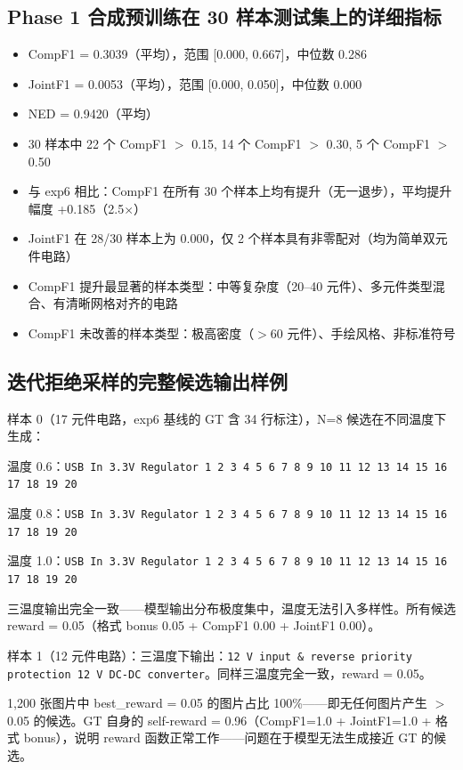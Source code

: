 \subsection{Phase 1 合成预训练在 30 样本测试集上的详细指标}

\begin{itemize}[nosep]
    \item CompF1 = 0.3039（平均），范围 [0.000, 0.667]，中位数 0.286
    \item JointF1 = 0.0053（平均），范围 [0.000, 0.050]，中位数 0.000
    \item NED = 0.9420（平均）
    \item 30 样本中 22 个 CompF1 $>$ 0.15, 14 个 CompF1 $>$ 0.30, 5 个 CompF1 $>$ 0.50
    \item 与 exp6 相比：CompF1 在所有 30 个样本上均有提升（无一退步），平均提升幅度 +0.185（2.5$\times$）
    \item JointF1 在 28/30 样本上为 0.000，仅 2 个样本具有非零配对（均为简单双元件电路）
    \item CompF1 提升最显著的样本类型：中等复杂度（20--40 元件）、多元件类型混合、有清晰网格对齐的电路
    \item CompF1 未改善的样本类型：极高密度（$>$60 元件）、手绘风格、非标准符号
\end{itemize}

\subsection{迭代拒绝采样的完整候选输出样例}

样本 0（17 元件电路，exp6 基线的 GT 含 34 行标注），N=8 候选在不同温度下生成：

温度 0.6：\texttt{USB In 3.3V Regulator 1 2 3 4 5 6 7 8 9 10 11 12 13 14 15 16 17 18 19 20}

温度 0.8：\texttt{USB In 3.3V Regulator 1 2 3 4 5 6 7 8 9 10 11 12 13 14 15 16 17 18 19 20}

温度 1.0：\texttt{USB In 3.3V Regulator 1 2 3 4 5 6 7 8 9 10 11 12 13 14 15 16 17 18 19 20}

三温度输出完全一致——模型输出分布极度集中，温度无法引入多样性。所有候选 reward = 0.05（格式 bonus 0.05 + CompF1 0.00 + JointF1 0.00）。

样本 1（12 元件电路）：三温度下输出：\texttt{12 V input \& reverse priority protection 12 V DC-DC converter}。同样三温度完全一致，reward = 0.05。

1,200 张图片中 best\_reward = 0.05 的图片占比 100\%——即无任何图片产生 $>$ 0.05 的候选。GT 自身的 self-reward = 0.96（CompF1=1.0 + JointF1=1.0 + 格式 bonus），说明 reward 函数正常工作——问题在于模型无法生成接近 GT 的候选。

